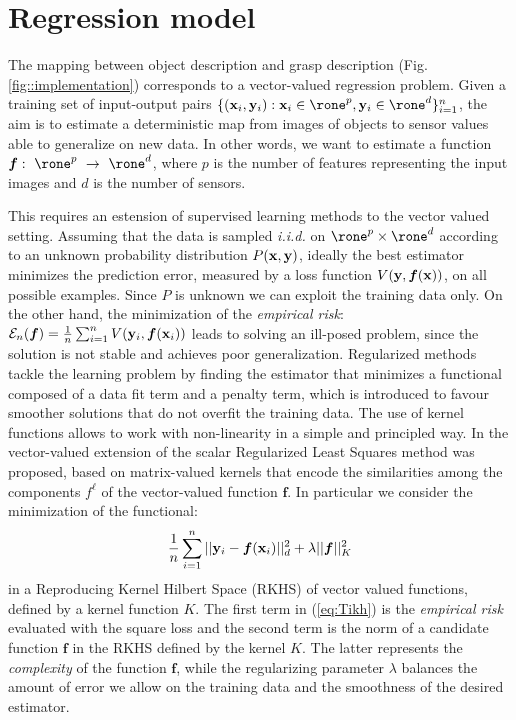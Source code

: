 \section{Regression model}
\label{sec::regression}

The mapping between object description and grasp description (Fig. \ref{fig::implementation})  corresponds to a vector-valued regression problem. 
Given a training set of input-output pairs $\{({\bf x}_i, {\bf y}_i): {\bf x}_i \in \rone^p,{\bf y}_i \in \rone^d \}_{i=1}^n$, 
the aim is to estimate a deterministic map from images of objects to sensor values able to generalize on new data. 
In other words, we want to estimate a function $\boldsymbol{f}:~\rone^p~\to~\rone^d$, 
where $p$ is the number of features representing the input images and $d$ is the number of sensors.

This requires an estension of supervised learning methods to the vector valued setting.
Assuming that the data is sampled  {\em i.i.d.} on $\rone^p \times \rone^d$ according to an unknown probability 
distribution $P({\bf x}, {\bf y})$, ideally the best estimator minimizes the prediction error, measured by a loss function $V({\bf y},\boldsymbol{f}({\bf x}))$, on all possible examples. Since $P$ is unknown we can exploit the training data only. 
On the other hand, the minimization of the \emph{empirical risk}:  $
\mathcal{E}_n(\boldsymbol{f})=\frac{1}{n}\sum_{i=1}^{n} V({\bf y}_i,\boldsymbol{f}({\bf x}_i))$ leads to solving an ill-posed problem, since the solution is  not stable and achieves poor generalization. 
Regularized methods tackle the learning problem by finding the estimator that minimizes a functional composed of a data fit term and a penalty term, which is introduced to favour smoother solutions that do not overfit the training data. The use of kernel functions allows to work with non-linearity in a simple and principled way. In \cite{MicchPon05Onlearning} the vector-valued extension of the scalar Regularized Least Squares method was proposed, based on matrix-valued kernels that encode the similarities among the components $f^\ell$ of the vector-valued function $\boldsymbol{f}$.
In particular we consider the minimization of the functional: 
\begin{equation}
\frac{1}{n}\sum_{i=1}^{n} ||{\bf y}_i - \boldsymbol{f}({\bf x}_i)||_d^2 + \lambda ||\boldsymbol{f}||_K^2
\label{eq:Tikh}
\end{equation}
in a Reproducing Kernel Hilbert Space (RKHS) of vector valued functions, defined by a kernel function $K$.
The first term in (\ref{eq:Tikh}) is the \emph{empirical risk} evaluated with the square loss and
the second term is the norm of a candidate function $\boldsymbol{f}$ in the RKHS defined by the kernel $K$. 
The latter represents the \emph{complexity} of the function $\boldsymbol{f}$, while the regularizing parameter $\lambda$ balances the amount of error we allow on the training data and the smoothness of the desired estimator. 


